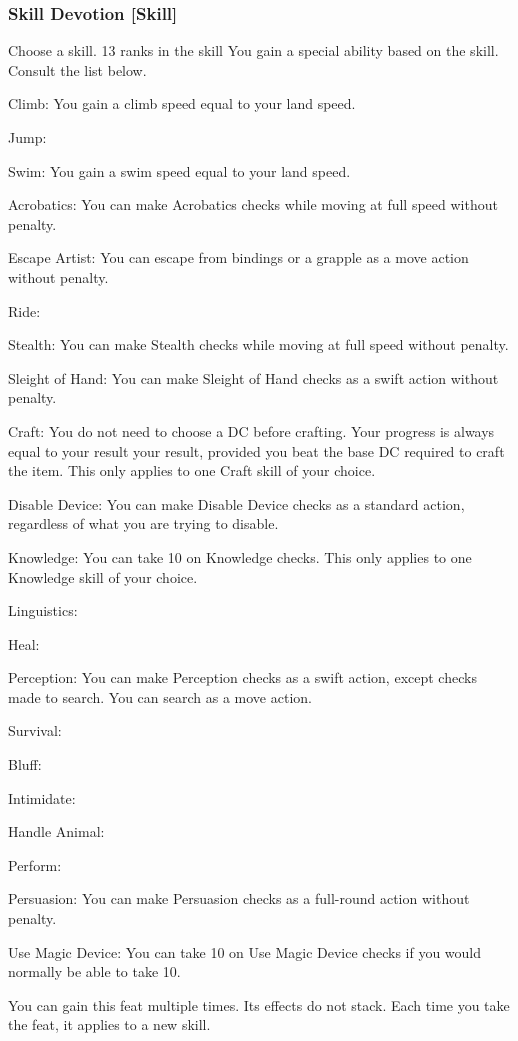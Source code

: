 \subsubsection{Skill Devotion [Skill]}
Choose a skill.
 13 ranks in the skill
 You gain a special ability based on the skill. Consult the list below.
\begin{itemize*}
\item Climb: You gain a climb speed equal to your land speed.
\item Jump: 
\item Swim: You gain a swim speed equal to your land speed.
\item Acrobatics: You can make Acrobatics checks while moving at full speed without penalty.
\item Escape Artist: You can escape from bindings or a grapple as a move action without penalty.
\item Ride: 
\item Stealth: You can make Stealth checks while moving at full speed without penalty.
\item Sleight of Hand: You can make Sleight of Hand checks as a swift action without penalty.
\item Craft: You do not need to choose a DC before crafting. Your progress is always equal to your result \mtimes your result, provided you beat the base DC required to craft the item. This only applies to one Craft skill of your choice.
\item Disable Device: You can make Disable Device checks as a standard action, regardless of what you are trying to disable.
\item Knowledge: You can take 10 on Knowledge checks. This only applies to one Knowledge skill of your choice.
\item Linguistics: 
\item Heal: 
\item Perception: You can make Perception checks as a swift action, except checks made to search. You can search as a move action.
\item Survival: 
\item Bluff: 
\item Intimidate:
\item Handle Animal: 
\item Perform:
\item Persuasion: You can make Persuasion checks as a full-round action without penalty.
\item Use Magic Device: You can take 10 on Use Magic Device checks if you would normally be able to take 10.
\end{itemize*}
 You can gain this feat multiple times. Its effects do not stack. Each time you take the feat, it applies to a new skill.

